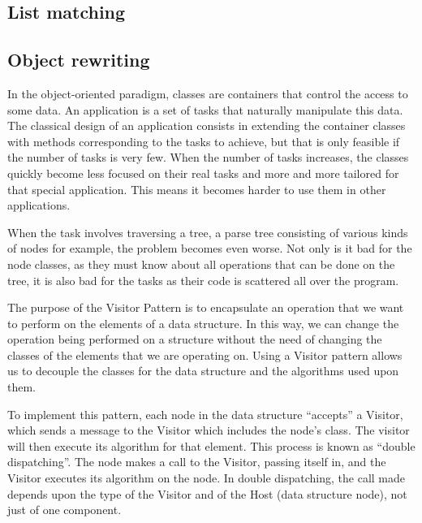 \documentclass[a4paper]{article}
\begin{document}

\subsection{List matching}




\subsection{Object rewriting}

In the object-oriented paradigm, classes are containers that control
the access to some data. 
An application is a set of tasks that naturally manipulate this data.
The classical design of an application consists in extending 
the container classes with methods corresponding to the tasks to
achieve, but that is only feasible if the number of tasks is very few.
When the number of tasks increases, the classes quickly become less
focused on their real tasks and more and more tailored for that
special application. This means it becomes harder to use them  in
other applications.  

When the task involves traversing a tree, a parse tree consisting of
various kinds of nodes for example, the problem becomes even
worse. Not only is it bad for the node classes, as they must know
about all operations that can be done  on the tree, it is also bad for
the tasks as their code is scattered all over the program. 

The purpose of the Visitor Pattern is to encapsulate an operation that
we want to perform on the elements of a data structure. In this
way, we can change the operation being performed on a structure
without the need of changing the classes of the elements that we are
operating on. Using a Visitor pattern allows us to decouple the
classes for the data structure and the algorithms used upon them.

To implement this pattern, each node in the data structure ``accepts''
a Visitor, which sends a message to the Visitor which includes the
node's class. The visitor will then execute its algorithm for that
element. This process is known as ``double dispatching''. The node makes
a call to the Visitor, passing itself in, and the Visitor executes its
algorithm on the node. In double dispatching, the call made depends
upon the type of the Visitor and of the Host (data structure node),
not just of one component. 
\end{document}
